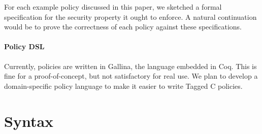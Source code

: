 \documentclass{llncs}
\begin{document}
For each example policy discussed in this paper, we sketched a formal specification for the
security property it ought to enforce. A natural continuation would be to prove the correctness
of each policy against these specifications.

\paragraph{Policy DSL}

Currently, policies are written in Gallina, the language embedded in Coq. This is fine for a
proof-of-concept, but not satisfactory for real use. We plan to develop a domain-specific policy
language to make it easier to write Tagged C policies.




\appendix

\section{Syntax}
\end{document}

